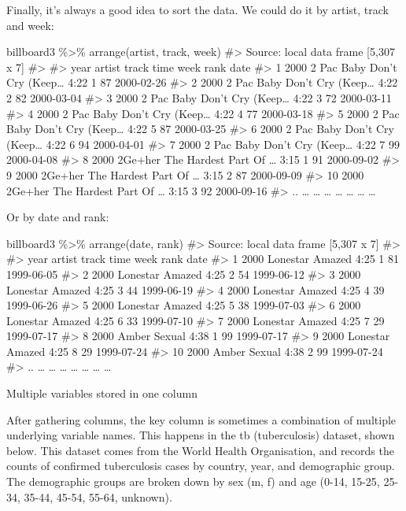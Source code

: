 \documentclass[]{article}
\begin{document}
Finally, it's always a good idea to sort the data. We could do it by
artist, track and week:

billboard3 \%\textgreater{}\% arrange(artist, track, week)
\#\textgreater{} Source: local data frame {[}5,307 x 7{]}
\#\textgreater{} \#\textgreater{} year artist track time week rank date
\#\textgreater{} 1 2000 2 Pac Baby Don't Cry (Keep\ldots{} 4:22 1 87
2000-02-26 \#\textgreater{} 2 2000 2 Pac Baby Don't Cry (Keep\ldots{}
4:22 2 82 2000-03-04 \#\textgreater{} 3 2000 2 Pac Baby Don't Cry
(Keep\ldots{} 4:22 3 72 2000-03-11 \#\textgreater{} 4 2000 2 Pac Baby
Don't Cry (Keep\ldots{} 4:22 4 77 2000-03-18 \#\textgreater{} 5 2000 2
Pac Baby Don't Cry (Keep\ldots{} 4:22 5 87 2000-03-25 \#\textgreater{} 6
2000 2 Pac Baby Don't Cry (Keep\ldots{} 4:22 6 94 2000-04-01
\#\textgreater{} 7 2000 2 Pac Baby Don't Cry (Keep\ldots{} 4:22 7 99
2000-04-08 \#\textgreater{} 8 2000 2Ge+her The Hardest Part Of \ldots{}
3:15 1 91 2000-09-02 \#\textgreater{} 9 2000 2Ge+her The Hardest Part Of
\ldots{} 3:15 2 87 2000-09-09 \#\textgreater{} 10 2000 2Ge+her The
Hardest Part Of \ldots{} 3:15 3 92 2000-09-16 \#\textgreater{} ..
\ldots{} \ldots{} \ldots{} \ldots{} \ldots{} \ldots{} \ldots{}

Or by date and rank:

billboard3 \%\textgreater{}\% arrange(date, rank) \#\textgreater{}
Source: local data frame {[}5,307 x 7{]} \#\textgreater{}
\#\textgreater{} year artist track time week rank date \#\textgreater{}
1 2000 Lonestar Amazed 4:25 1 81 1999-06-05 \#\textgreater{} 2 2000
Lonestar Amazed 4:25 2 54 1999-06-12 \#\textgreater{} 3 2000 Lonestar
Amazed 4:25 3 44 1999-06-19 \#\textgreater{} 4 2000 Lonestar Amazed 4:25
4 39 1999-06-26 \#\textgreater{} 5 2000 Lonestar Amazed 4:25 5 38
1999-07-03 \#\textgreater{} 6 2000 Lonestar Amazed 4:25 6 33 1999-07-10
\#\textgreater{} 7 2000 Lonestar Amazed 4:25 7 29 1999-07-17
\#\textgreater{} 8 2000 Amber Sexual 4:38 1 99 1999-07-17
\#\textgreater{} 9 2000 Lonestar Amazed 4:25 8 29 1999-07-24
\#\textgreater{} 10 2000 Amber Sexual 4:38 2 99 1999-07-24
\#\textgreater{} .. \ldots{} \ldots{} \ldots{} \ldots{} \ldots{}
\ldots{} \ldots{}

Multiple variables stored in one column

After gathering columns, the key column is sometimes a combination of
multiple underlying variable names. This happens in the tb
(tuberculosis) dataset, shown below. This dataset comes from the World
Health Organisation, and records the counts of confirmed tuberculosis
cases by country, year, and demographic group. The demographic groups
are broken down by sex (m, f) and age (0-14, 15-25, 25-34, 35-44, 45-54,
55-64, unknown).
\end{document}
